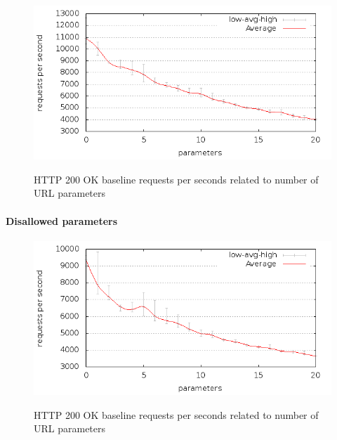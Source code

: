 \documentclass[Measurements]{subfiles}
\begin{document}
\begin{figure}[H]
\caption{HTTP 200 OK baseline requests per seconds related to number of URL parameters}
\centering
\includegraphics[scale=0.55] {images/results/200_with_naxsi_incremented_allowed_parameters/output.png}
\label{fig:Baseline performance measurement}
\end{figure}

\paragraph{Disallowed parameters}

\begin{figure}[H]
\caption{HTTP 200 OK baseline requests per seconds related to number of URL parameters}
\centering
\includegraphics[scale=0.55] {images/results/200_with_naxsi_incremented_disallowed_parameters/output.png}
\label{fig:Baseline performance measurement}
\end{figure}
\end{document}
